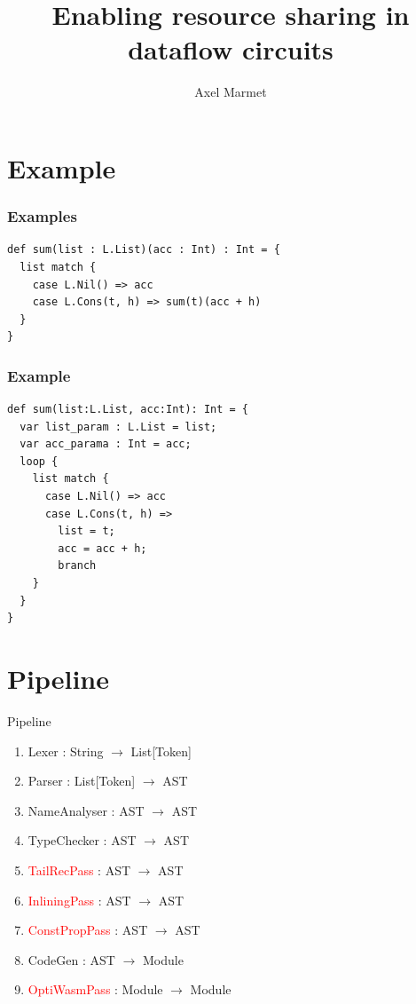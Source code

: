 \documentclass{beamer}
\title[Resource Sharing] %
{Enabling resource sharing in dataflow circuits}
\author[Marmet] %
{Axel Marmet}
\institute[EPFL] %
\date[EPFL 2019] %
\renewcommand{\emph}{\textcolor{red}}
\begin{document}
\frame{\titlepage}



\section{Example}
\begin{frame}[fragile]
\frametitle{Examples}
\begin{lstlisting}[basicstyle=\ttfamily]
def sum(list : L.List)(acc : Int) : Int = {
  list match {
    case L.Nil() => acc
    case L.Cons(t, h) => sum(t)(acc + h)
  }
}
\end{lstlisting}
\end{frame}

\begin{frame}[fragile]
\frametitle{Example}
\begin{lstlisting}[basicstyle=\ttfamily]
def sum(list:L.List, acc:Int): Int = {
  var list_param : L.List = list;
  var acc_parama : Int = acc;
  loop {
    list match {
      case L.Nil() => acc
      case L.Cons(t, h) => 
        list = t;
        acc = acc + h;
        branch
    } 
  }
}
\end{lstlisting}
\end{frame}

\section{Pipeline}
\begin{frame}{Pipeline}
    \begin{enumerate}
        \item Lexer : String $\rightarrow$ List[Token]
        \item Parser : List[Token] $\rightarrow$ AST
        \item NameAnalyser : AST $\rightarrow$ AST
        \item TypeChecker : AST $\rightarrow$ AST
        \item \emph{TailRecPass} : AST $\rightarrow$ AST
        \item \emph{InliningPass} : AST $\rightarrow$ AST
        \item \emph{ConstPropPass} : AST $\rightarrow$ AST
        \item CodeGen : AST $\rightarrow$ Module
        \item \emph{OptiWasmPass} : Module $\rightarrow$ Module
    \end{enumerate}
\end{frame}
\end{document}
